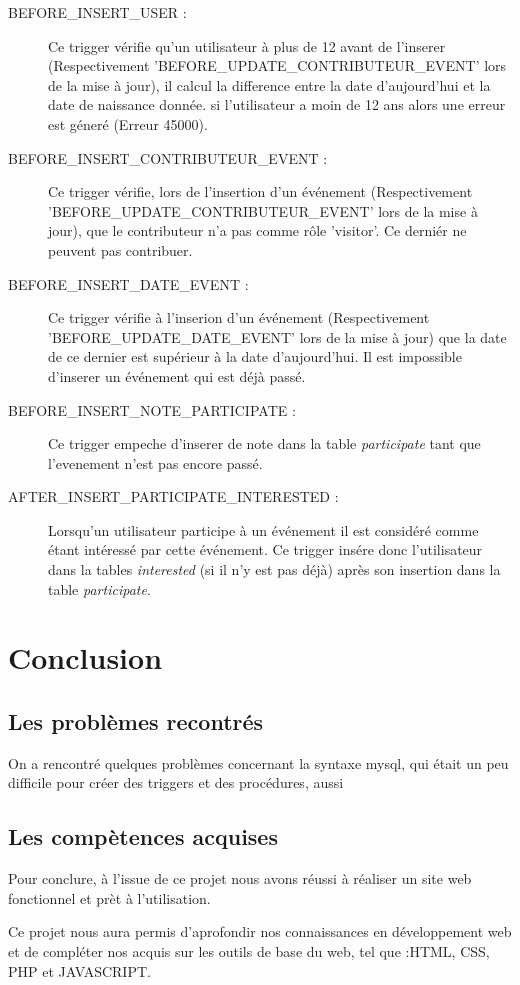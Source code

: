 \documentclass[oneside,11pt,a4paper]{article}
\begin{document}
\begin{description}
	\item[BEFORE\_INSERT\_USER : ] Ce trigger vérifie qu'un utilisateur à plus de 12 avant de l'inserer (Respectivement 'BEFORE\_UPDATE\_CONTRIBUTEUR\_EVENT' lors de la mise à jour), il calcul la difference entre la date d'aujourd'hui et la date de naissance donnée. si l'utilisateur a moin de 12 ans alors une erreur est géneré (Erreur 45000).
	\item[BEFORE\_INSERT\_CONTRIBUTEUR\_EVENT : ] Ce trigger vérifie, lors de l'insertion d'un événement (Respectivement 'BEFORE\_UPDATE\_CONTRIBUTEUR\_EVENT' lors de la mise à jour), que le contributeur n'a pas comme rôle 'visitor'. Ce derniér ne peuvent pas contribuer.
	\item[BEFORE\_INSERT\_DATE\_EVENT : ] Ce trigger vérifie à l'inserion d'un événement (Respectivement 'BEFORE\_UPDATE\_DATE\_EVENT' lors de la mise à jour) que la date de ce dernier est supérieur à la date d'aujourd'hui. Il est impossible d'inserer un événement qui est déjà passé.
	\item[BEFORE\_INSERT\_NOTE\_PARTICIPATE : ] Ce trigger empeche d'inserer de note dans la table \textit{participate} tant que l'evenement n'est pas encore passé.
	\item[AFTER\_INSERT\_PARTICIPATE\_INTERESTED : ] Lorsqu'un utilisateur participe à un événement il est considéré comme étant intéressé par cette événement. Ce trigger insére donc l'utilisateur dans la tables \textit{interested} (si il n'y est pas déjà) après son insertion dans la table \textit{participate}.
\end{description}

\section{Conclusion}

\subsection{Les problèmes recontrés}
On a rencontré quelques problèmes concernant la syntaxe mysql, qui était un peu difficile pour créer des triggers et des procédures, aussi 

\subsection{Les compètences acquises}

Pour conclure, à l’issue de ce projet nous avons réussi à réaliser un site web fonctionnel et prèt à l'utilisation. 

Ce projet nous aura permis d’aprofondir nos connaissances en développement web et de compléter nos acquis sur les outils de base du web, tel que :HTML, CSS, PHP et JAVASCRIPT.
\end{document}

